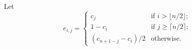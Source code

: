 \documentclass[letterpaper]{article} %
\newtheorem{lemma}[thm]{Lemma}
\DeclareMathOperator{\support}{support}
\begin{document}
	
	
	Let 
	$$e_{i,j} = \begin{cases}
	c_j   & \text{if } i > \lfloor n/2 \rfloor; \\
	1-c_i & \text{if } j \geq \lceil n/2 \rceil; \\
	(c_{n+1-j} {-} c_i)/2  & \text{otherwise}.
	\end{cases}$$












\end{document}
